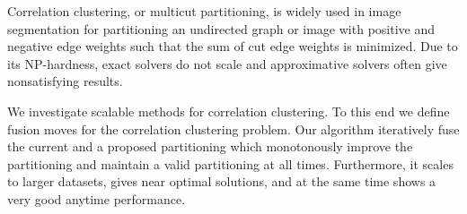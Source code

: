Correlation clustering, or multicut partitioning,
is widely used in image segmentation for
partitioning an undirected graph or image with positive and negative edge weights 
such that the sum of cut edge weights is minimized.
%
Due to its NP-hardness, exact solvers do not scale and approximative solvers often give nonsatisfying results.

We investigate scalable methods for correlation clustering.
To this end we define fusion moves for the correlation clustering problem.
Our algorithm iteratively fuse the current and a proposed partitioning which  monotonously improve
the partitioning and maintain a valid partitioning at all times.
Furthermore, it scales to larger datasets, gives near optimal solutions, and at the same time shows
a very good anytime performance.
